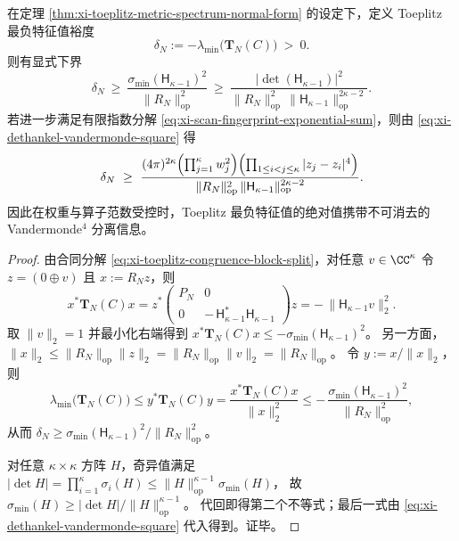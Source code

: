 \begin{proposition}\label{prop:xi-toeplitz-negative-margin-vandermonde4-lowerbound}
在定理 \ref{thm:xi-toeplitz-metric-spectrum-normal-form} 的设定下，定义 Toeplitz 最负特征值裕度
\[
\delta_N:=-\lambda_{\min}\!\bigl(\mathbf{T}_N(C)\bigr)\ >\ 0.
\]
则有显式下界
\[
\delta_N\ \ge\ \frac{\sigma_{\min}(\mathsf H_{\kappa-1})^2}{\|R_N\|_{\mathrm{op}}^{2}}
\ \ge\
\frac{\bigl|\det(\mathsf H_{\kappa-1})\bigr|^2}{\|R_N\|_{\mathrm{op}}^{2}\,\|\mathsf H_{\kappa-1}\|_{\mathrm{op}}^{2\kappa-2}}.
\]
若进一步满足有限指数分解 \eqref{eq:xi-scan-fingerprint-exponential-sum}，则由 \eqref{eq:xi-dethankel-vandermonde-square} 得
\[
\delta_N\ \ge\
\frac{(4\pi)^{2\kappa}\Bigl(\prod_{j=1}^{\kappa}w_j^{2}\Bigr)\Bigl(\prod_{1\le i<j\le\kappa}|z_j-z_i|^{4}\Bigr)}
{\|R_N\|_{\mathrm{op}}^{2}\,\|\mathsf H_{\kappa-1}\|_{\mathrm{op}}^{2\kappa-2}}.
\]
因此在权重与算子范数受控时，Toeplitz 最负特征值的绝对值携带不可消去的 Vandermonde\({}^{4}\) 分离信息。
\end{proposition}
\begin{proof}
由合同分解 \eqref{eq:xi-toeplitz-congruence-block-split}，对任意 \(v\in\CC^{\kappa}\) 令 \(z=(0\oplus v)\) 且 \(x:=R_N z\)，则
\[
x^{\ast}\mathbf{T}_N(C)x=z^{\ast}\begin{pmatrix}P_N&0\\0&-\,\mathsf H_{\kappa-1}^{\ast}\mathsf H_{\kappa-1}\end{pmatrix}z
=-\,\|\mathsf H_{\kappa-1}v\|_2^2.
\]
取 \(\|v\|_2=1\) 并最小化右端得到
\(
x^{\ast}\mathbf{T}_N(C)x\le -\sigma_{\min}(\mathsf H_{\kappa-1})^2
\)。
另一方面，\(\|x\|_2\le \|R_N\|_{\mathrm{op}}\|z\|_2=\|R_N\|_{\mathrm{op}}\|v\|_2=\|R_N\|_{\mathrm{op}}\)。
令 \(y:=x/\|x\|_2\)，则
\[
\lambda_{\min}\!\bigl(\mathbf{T}_N(C)\bigr)
\le y^{\ast}\mathbf{T}_N(C)y
=\frac{x^{\ast}\mathbf{T}_N(C)x}{\|x\|_2^2}
\le -\,\frac{\sigma_{\min}(\mathsf H_{\kappa-1})^2}{\|R_N\|_{\mathrm{op}}^{2}},
\]
从而 \(\delta_N\ge \sigma_{\min}(\mathsf H_{\kappa-1})^2/\|R_N\|_{\mathrm{op}}^{2}\)。
\par
对任意 \(\kappa\times\kappa\) 方阵 \(H\)，奇异值满足
\(
|\det H|=\prod_{i=1}^{\kappa}\sigma_i(H)\le \|H\|_{\mathrm{op}}^{\kappa-1}\sigma_{\min}(H)
\)，
故
\(
\sigma_{\min}(H)\ge |\det H|/\|H\|_{\mathrm{op}}^{\kappa-1}
\)。
代回即得第二个不等式；最后一式由 \eqref{eq:xi-dethankel-vandermonde-square} 代入得到。证毕。
\end{proof}

